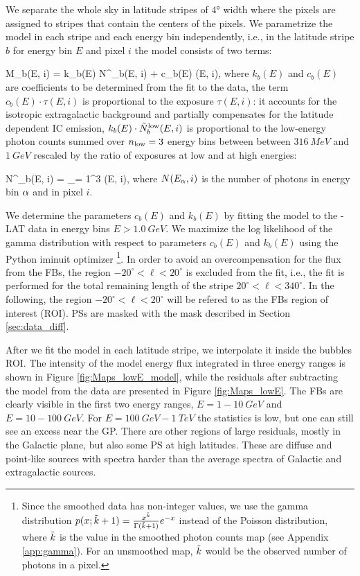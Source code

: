 We separate the whole sky in latitude stripes of $\ang{4}$ width where the \Healpix pixels are assigned to stripes that contain the centers of the pixels.
We parametrize the model in each stripe and each energy bin independently, i.e., 
in the latitude stripe $b$ for energy bin $E$ and pixel $i$ the model consists of two terms:

\be
{}
M_{b}(E, i) = k_{b}(E) \cdot \tilde N^\low_{b}(E, i) + c_b(E) \cdot \tau(E, i),
\ee
where $k_{b}(E)$ and $c_b(E)$ are coefficients to be determined from the fit to the data,
the term $c_b(E) \cdot \tau(E, i)$ is proportional to the exposure $\tau(E, i)$: it accounts for the isotropic extragalactic background and partially compensates for the latitude dependent IC emission,
$k_{b}(E) \cdot \tilde N^{\text{low}}_b(E, i)$ is proportional to the low-energy photon counts summed over 
$n_{\text{low}} = 3$ energy bins between between $\SI{316}{MeV}$ and $\SI{1}{GeV}$ 
rescaled by the ratio of exposures at low and at high energies:

\be
\tilde N^\low_b(E, i) =  \sum_{\alpha = 1}^3  \tau(E, i),
\ee
where $N(E_\alpha, i)$ is the number of photons in energy bin $\alpha$ and in pixel $i$.

We determine the parameters $c_{b}(E)$ and $k_{b}(E)$ by fitting the model to the \Fermi-LAT data in energy bins $E > \SI{1.0}{GeV}$.
We maximize the log likelihood of the gamma distribution 
with respect to parameters $c_{b}(E)$ and $k_{b}(E)$
using the Python iminuit optimizer%
\footnote{
Since the smoothed data has non-integer values, 
we use the gamma distribution $p(x; \tilde{k} + 1) = \frac{x^{\tilde{k}}}{\Gamma (\tilde{k} + 1)}e^{-x}$ instead of the Poisson distribution, 
where $\tilde{k}$ is the value in the smoothed photon counts map (see Appendix \ref{app:gamma}).
For an unsmoothed map, $\tilde{k}$ would be the observed number of photons in a pixel.
}.
In order to avoid an overcompensation 
for the flux from the FBs, the region $-20^\circ < \ell < 20^\circ$
is excluded from the fit, i.e., the fit is performed for 
the total remaining length of the stripe $20^\circ < \ell < 340^\circ$.
In the following, the region $-20^\circ < \ell < 20^\circ$ will be refered to as the FBs region of interest (ROI).
PSs are masked with the mask described in Section \ref{sec:data_diff}.


After we fit the model in each latitude stripe, we interpolate it inside the bubbles ROI.
The intensity of the model energy flux integrated in three energy ranges
is shown in Figure \ref{fig:Maps_lowE_model},
while the residuals after subtracting the model from the data are presented in Figure \ref{fig:Maps_lowE}.
The FBs are clearly visible in the first two energy ranges, $E = 1 - \SI{10}{GeV}$ and $E = 10 - \SI{100}{GeV}$.
For $E = \SI{100}{GeV} - \SI{1}{TeV}$ the statistics is low, but one can still see an excess near the GP.
There are other regions of large residuals, mostly in the Galactic plane, but also some PS at high latitudes.
These are diffuse and point-like sources with spectra harder than the average spectra of Galactic and
extragalactic sources.

